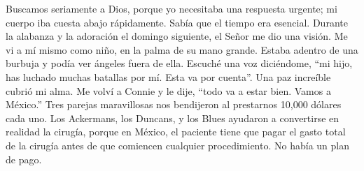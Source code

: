 \documentclass[twoside, 12pt]{book}
\begin{document}
Buscamos seriamente a Dios, porque yo necesitaba una respuesta urgente; mi cuerpo iba cuesta abajo rápidamente.  Sabía que el tiempo era esencial. Durante la alabanza y la adoración el domingo siguiente, el Señor me dio una visión. Me vi a mí mismo como niño, en la palma de su mano grande. Estaba adentro de una burbuja y podía ver ángeles fuera de ella. Escuché una voz diciéndome, “mi hijo, has luchado muchas batallas por mí. Esta va por cuenta”. Una paz increíble cubrió mi alma. Me volví a Connie y le dije, “todo va a estar bien. Vamos a México.” Tres parejas maravillosas nos bendijeron al prestarnos 10,000 dólares cada uno.  Los Ackermans, los Duncans, y los Blues ayudaron a convertirse en realidad la cirugía, porque en México, el paciente tiene que pagar el gasto total de la cirugía antes de que comiencen cualquier procedimiento. No había un plan de pago.\\
\end{document}
